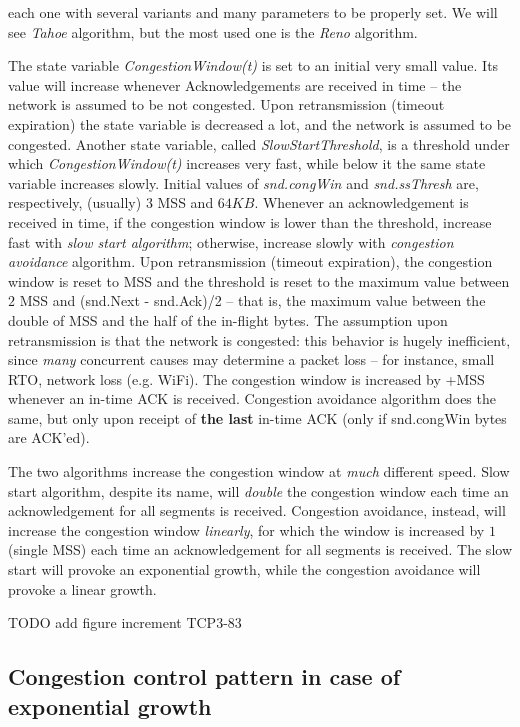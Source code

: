 \documentclass[a4paper, 11pt]{report}
\begin{document}
each one with several variants and many parameters to be properly set. We will
see \emph{Tahoe} algorithm, but the most used one is the \emph{Reno}
algorithm.

The state variable \emph{CongestionWindow(t)} is set to an initial very small
value. Its value will increase whenever Acknowledgements are received in time
\--- the network is assumed to be not congested. Upon retransmission (timeout
expiration) the state variable is decreased a lot, and the network is assumed
to be congested. Another state variable, called \emph{SlowStartThreshold}, is
a threshold under which \emph{CongestionWindow(t)} increases very fast, while
below it the same state variable increases slowly. Initial values of
\emph{snd.congWin} and \emph{snd.ssThresh} are, respectively, (usually) $3$ MSS
and $64KB$. Whenever an acknowledgement is received in time, if the congestion
window is lower than the threshold, increase fast with \emph{slow start
algorithm}; otherwise, increase slowly with \emph{congestion avoidance}
algorithm. Upon retransmission (timeout expiration), the congestion window is
reset to MSS and the threshold is reset to the maximum value between $2$ MSS
and (snd.Next - snd.Ack)/2 \--- that is, the maximum value between the double
of MSS and the half of the in-flight bytes. The assumption upon retransmission
is that the network is congested: this behavior is hugely inefficient, since
\emph{many} concurrent causes may determine a packet loss \--- for instance,
small RTO, network loss (e.g. WiFi). The congestion window is increased by +MSS
whenever an in-time ACK is received. Congestion avoidance algorithm does the
same, but only upon receipt of \textbf{the last} in-time ACK (only if
snd.congWin bytes are ACK'ed). 

The two algorithms increase the congestion window at \emph{much} different
speed. Slow start algorithm, despite its name, will \emph{double} the
congestion window each time an acknowledgement for all segments is received.
Congestion avoidance, instead, will increase the congestion window
\emph{linearly}, for which the window is increased by $1$ (single MSS) each
time an acknowledgement for all segments is received. The slow start will
provoke an exponential growth, while the congestion avoidance will provoke a
linear growth. 

TODO add figure increment TCP3-83

\subsection{Congestion control pattern in case of exponential growth}
\end{document}
